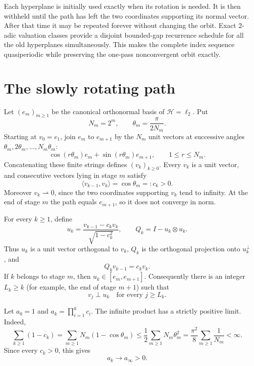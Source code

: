 \documentclass[11pt]{article}
\newcommand{\Hh}{\mathcal H}
\begin{document}
Each hyperplane is initially used exactly when its rotation is needed.  It is
then withheld until the path has left the two coordinates supporting its
normal vector.  After that time it may be repeated forever without changing
the orbit.  Exact $2$-adic valuation classes provide a disjoint bounded-gap
recurrence schedule for all the old hyperplanes simultaneously.  This makes
the complete index sequence quasiperiodic while preserving the one-pass
nonconvergent orbit exactly.

\section{The slowly rotating path}

Let $(e_m)_{m\geq1}$ be the canonical orthonormal basis of
$\Hh=\ell_2$.  Put
\[
 N_m=2^m,
 \qquad
 \theta_m=\frac{\pi}{2N_m}.
\]
Starting at $v_0=e_1$, join $e_m$ to $e_{m+1}$ by the $N_m$ unit vectors
at successive angles $\theta_m,2\theta_m,\ldots,N_m\theta_m$:
\[
 \cos(r\theta_m)e_m+\sin(r\theta_m)e_{m+1},
 \qquad 1\leq r\leq N_m.
\]
Concatenating these finite strings defines $(v_k)_{k\geq0}$.  Every
$v_k$ is a unit vector, and consecutive vectors lying in stage $m$ satisfy
\[
 \langle v_{k-1},v_k\rangle=\cos\theta_m=:c_k>0.
\]
Moreover $v_k\rightharpoonup0$, since the two coordinates supporting $v_k$
tend to infinity.  At the end of stage $m$ the path equals $e_{m+1}$, so it
does not converge in norm.

For every $k\geq1$, define
\[
 u_k=\frac{v_{k-1}-c_kv_k}{\sqrt{1-c_k^2}},
 \qquad
 Q_k=I-u_k\otimes u_k.
\]
Thus $u_k$ is a unit vector orthogonal to $v_k$, $Q_k$ is the orthogonal
projection onto $u_k^\perp$, and
\begin{equation}\label{eq:rotation}
 Q_kv_{k-1}=c_kv_k.
\end{equation}
If $k$ belongs to stage $m$, then $u_k\in[e_m,e_{m+1}]$.  Consequently
there is an integer $L_k\geq k$ (for example, the end of stage $m+1$) such
that
\begin{equation}\label{eq:safe}
 v_j\perp u_k\quad\text{for every }j\geq L_k.
\end{equation}

Let $a_0=1$ and $a_k=\prod_{i=1}^kc_i$.  The infinite product has a
strictly positive limit.  Indeed,
\[
 \sum_{k\geq1}(1-c_k)
 =\sum_{m\geq1}N_m(1-\cos\theta_m)
 \leq \frac12\sum_{m\geq1}N_m\theta_m^2
 =\frac{\pi^2}{8}\sum_{m\geq1}\frac1{N_m}<\infty.
\]
Since every $c_k>0$, this gives
\begin{equation}\label{eq:positive}
 a_k\longrightarrow a_\infty>0.
\end{equation}
\end{document}
